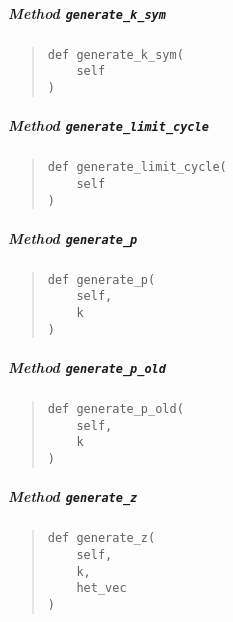 \documentclass[english,a4paper,oneside]{article}
\let\oldsubparagraph\subparagraph
\renewcommand{\subparagraph}[1]{\oldsubparagraph{#1}\mbox{}}
\begin{document}
\hypertarget{StrongCoupling.StrongCoupling.generate_k_sym}{%
\subparagraph{\texorpdfstring{Method
\texttt{generate\_k\_sym}}{Method generate\_k\_sym}}\label{StrongCoupling.StrongCoupling.generate_k_sym}}

\begin{quote}
\begin{verbatim}
def generate_k_sym(
    self
)
\end{verbatim}
\end{quote}

\hypertarget{StrongCoupling.StrongCoupling.generate_limit_cycle}{%
\subparagraph{\texorpdfstring{Method
\texttt{generate\_limit\_cycle}}{Method generate\_limit\_cycle}}\label{StrongCoupling.StrongCoupling.generate_limit_cycle}}

\begin{quote}
\begin{verbatim}
def generate_limit_cycle(
    self
)
\end{verbatim}
\end{quote}

\hypertarget{StrongCoupling.StrongCoupling.generate_p}{%
\subparagraph{\texorpdfstring{Method
\texttt{generate\_p}}{Method generate\_p}}\label{StrongCoupling.StrongCoupling.generate_p}}

\begin{quote}
\begin{verbatim}
def generate_p(
    self,
    k
)
\end{verbatim}
\end{quote}

\hypertarget{StrongCoupling.StrongCoupling.generate_p_old}{%
\subparagraph{\texorpdfstring{Method
\texttt{generate\_p\_old}}{Method generate\_p\_old}}\label{StrongCoupling.StrongCoupling.generate_p_old}}

\begin{quote}
\begin{verbatim}
def generate_p_old(
    self,
    k
)
\end{verbatim}
\end{quote}

\hypertarget{StrongCoupling.StrongCoupling.generate_z}{%
\subparagraph{\texorpdfstring{Method
\texttt{generate\_z}}{Method generate\_z}}\label{StrongCoupling.StrongCoupling.generate_z}}

\begin{quote}
\begin{verbatim}
def generate_z(
    self,
    k,
    het_vec
)
\end{verbatim}
\end{quote}
\end{document}
